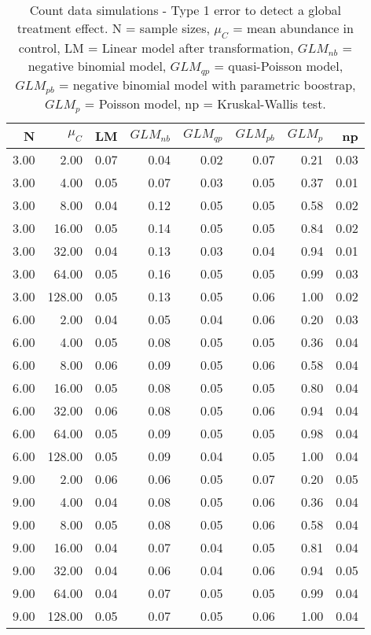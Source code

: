 \begin{table}
\centering
\caption[Count data simulations - Type 1 error to detect a global treatment effect.]{Count data simulations - Type 1 error to detect a global treatment effect. N = sample sizes, 
             $\mu_C$ = mean abundance in control, LM = Linear model after transformation, 
             $GLM_{nb}$ = negative binomial model, $GLM_{qp}$ = quasi-Poisson model, 
             $GLM_{pb}$ = negative binomial model with parametric boostrap, 
             $GLM_{p}$ = Poisson model, np = Kruskal-Wallis test.} 
\label{tab:t1_glob_c}
{\footnotesize
\begin{tabular}{rrrrrrrr}
  \hline
N & $\mu_C$ & LM & $GLM_{nb}$ & $GLM_{qp}$ & $GLM_{pb}$ & $GLM_{p}$ & np \\ 
  \hline
3.00 & 2.00 & 0.07 & 0.04 & 0.02 & 0.07 & 0.21 & 0.03 \\ 
  3.00 & 4.00 & 0.05 & 0.07 & 0.03 & 0.05 & 0.37 & 0.01 \\ 
  3.00 & 8.00 & 0.04 & 0.12 & 0.05 & 0.05 & 0.58 & 0.02 \\ 
  3.00 & 16.00 & 0.05 & 0.14 & 0.05 & 0.05 & 0.84 & 0.02 \\ 
  3.00 & 32.00 & 0.04 & 0.13 & 0.03 & 0.04 & 0.94 & 0.01 \\ 
  3.00 & 64.00 & 0.05 & 0.16 & 0.05 & 0.05 & 0.99 & 0.03 \\ 
  3.00 & 128.00 & 0.05 & 0.13 & 0.05 & 0.06 & 1.00 & 0.02 \\ 
  6.00 & 2.00 & 0.04 & 0.05 & 0.04 & 0.06 & 0.20 & 0.03 \\ 
  6.00 & 4.00 & 0.05 & 0.08 & 0.05 & 0.05 & 0.36 & 0.04 \\ 
  6.00 & 8.00 & 0.06 & 0.09 & 0.05 & 0.06 & 0.58 & 0.04 \\ 
  6.00 & 16.00 & 0.05 & 0.08 & 0.05 & 0.05 & 0.80 & 0.04 \\ 
  6.00 & 32.00 & 0.06 & 0.08 & 0.05 & 0.06 & 0.94 & 0.04 \\ 
  6.00 & 64.00 & 0.05 & 0.09 & 0.05 & 0.05 & 0.98 & 0.04 \\ 
  6.00 & 128.00 & 0.05 & 0.09 & 0.04 & 0.05 & 1.00 & 0.04 \\ 
  9.00 & 2.00 & 0.06 & 0.06 & 0.05 & 0.07 & 0.20 & 0.05 \\ 
  9.00 & 4.00 & 0.04 & 0.08 & 0.05 & 0.06 & 0.36 & 0.04 \\ 
  9.00 & 8.00 & 0.05 & 0.08 & 0.05 & 0.06 & 0.58 & 0.04 \\ 
  9.00 & 16.00 & 0.04 & 0.07 & 0.04 & 0.05 & 0.81 & 0.04 \\ 
  9.00 & 32.00 & 0.04 & 0.06 & 0.04 & 0.06 & 0.94 & 0.05 \\ 
  9.00 & 64.00 & 0.04 & 0.07 & 0.05 & 0.05 & 0.99 & 0.04 \\ 
  9.00 & 128.00 & 0.05 & 0.07 & 0.05 & 0.06 & 1.00 & 0.04 \\ 
   \hline
\end{tabular}
}
\end{table}
